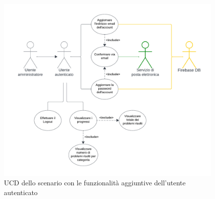 \documentclass[11pt, a4paper]{article}
\theoremstyle{definition} %
\begin{document}
\begin{figure}[H]
\centering
\hspace*{-1.4cm}
\includegraphics[scale=0.8]{materiale/ucdiagrams/ucaccount.pdf}
\caption{UCD dello scenario con le funzionalità aggiuntive dell'utente autenticato}
\end{figure}

\newpage
\end{document}
